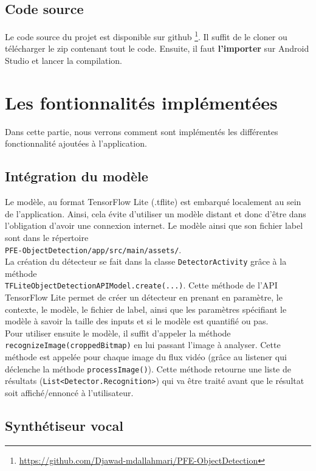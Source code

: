\documentclass[UTF8]{EPURapport}
\begin{document}
\section{Code source}
Le code source du projet est disponible sur github \footnote{\url{https://github.com/Djawad-mdallahmari/PFE-ObjectDetection}}. Il suffit de le cloner ou télécharger le zip contenant tout le code. Ensuite, il faut \textbf{l'importer} sur Android Studio et lancer la compilation.

\chapter{Les fontionnalités implémentées}
Dans cette partie, nous verrons comment sont implémentés les différentes fonctionnalité ajoutées à l'application.

\section{Intégration du modèle}

Le modèle, au format TensorFlow Lite (.tflite) est embarqué localement au sein de l'application. Ainsi, cela évite d'utiliser un modèle distant et donc d'être dans l'obligation d'avoir une connexion internet. Le modèle ainsi que son fichier label sont dans le répertoire\\ \verb|PFE-ObjectDetection/app/src/main/assets/|.\\

La création du détecteur se fait dans la classe \verb|DetectorActivity| grâce à la méthode\\ \verb|TFLiteObjectDetectionAPIModel.create(...)|. Cette méthode de l'API TensorFlow Lite permet de créer un détecteur en prenant en paramètre, le contexte, le modèle, le fichier de label, ainsi que les paramètres spécifiant le modèle à savoir la taille des inputs et si le modèle est quantifié ou pas. \\

Pour utiliser ensuite le modèle, il suffit d'appeler la méthode \verb|recognizeImage(croppedBitmap)| en lui passant l'image à analyser. Cette méthode est appelée pour chaque image du flux vidéo (grâce au listener qui déclenche la méthode \verb|processImage()|). Cette méthode retourne une liste de résultats (\verb|List<Detector.Recognition>|) qui va être traité avant que le résultat soit affiché/ennoncé à l'utilisateur.

\section{Synthétiseur vocal}
\end{document}
